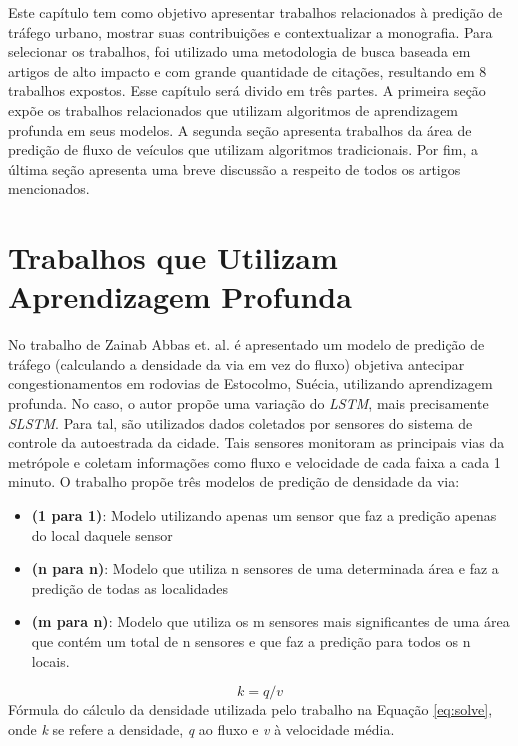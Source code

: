 \label{chapter:trabalhos_relacionados}

Este capítulo tem como objetivo apresentar trabalhos relacionados à predição de tráfego urbano, mostrar suas contribuições e contextualizar a monografia. Para selecionar os trabalhos, foi utilizado uma metodologia de busca baseada em artigos de alto impacto e com grande quantidade de citações, resultando em 8 trabalhos expostos. Esse capítulo será divido em três partes. A primeira seção expõe os trabalhos relacionados que utilizam algoritmos de aprendizagem profunda em seus modelos. A segunda seção apresenta trabalhos da área de predição de fluxo de veículos que utilizam algoritmos tradicionais. Por fim, a última seção apresenta uma breve discussão a respeito de todos os artigos mencionados. 

\section{Trabalhos que Utilizam Aprendizagem Profunda}

No trabalho de Zainab Abbas et. al. \cite{Zainab_2018} é apresentado um modelo de predição de tráfego (calculando a densidade da via em vez do fluxo) objetiva antecipar congestionamentos em rodovias de Estocolmo, Suécia, utilizando aprendizagem profunda. No caso, o autor propõe uma variação do \textit{\acrshort{LSTM}}, mais precisamente \textit{\acrfull{SLSTM}}. Para tal, são utilizados dados coletados por sensores do sistema de controle da autoestrada da cidade. Tais sensores monitoram as principais vias da metrópole e coletam informações como fluxo e velocidade de cada faixa a cada 1 minuto. O trabalho propõe três modelos de predição de densidade da via:

\begin{itemize}
    \item \textbf{(1 para 1)}: Modelo utilizando apenas um sensor que faz a predição apenas do local daquele sensor
    \item \textbf{(n para n)}: Modelo que utiliza n sensores de uma determinada área e faz a predição de todas as localidades
    \item \textbf{(m para n)}: Modelo que utiliza os m sensores mais significantes de uma área que contém um total de n sensores e que faz a predição para todos os n locais.
\end{itemize}

\begin{equation}\label{eq:solve}
k = q / v
\end{equation}
Fórmula do cálculo da densidade utilizada pelo trabalho na Equação \ref{eq:solve}, onde \textit{k} se refere a densidade, \textit{q} ao fluxo e \textit{v} à velocidade média.

